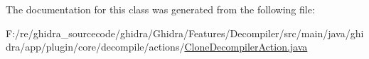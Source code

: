 The documentation for this class was generated from the following file\+:\begin{DoxyCompactItemize}
\item 
F\+:/re/ghidra\+\_\+sourcecode/ghidra/\+Ghidra/\+Features/\+Decompiler/src/main/java/ghidra/app/plugin/core/decompile/actions/\mbox{\hyperlink{_clone_decompiler_action_8java}{Clone\+Decompiler\+Action.\+java}}\end{DoxyCompactItemize}

